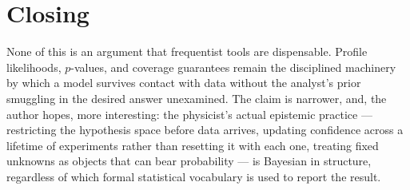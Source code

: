\documentclass[11pt]{book}
\theoremstyle{definition}
\theoremstyle{plain}
\theoremstyle{remark}
\begin{document}
\section{Closing}

None of this is an argument that frequentist tools are dispensable. Profile likelihoods, $p$-values, and coverage guarantees remain the disciplined machinery by which a model survives contact with data without the analyst's prior smuggling in the desired answer unexamined. The claim is narrower, and, the author hopes, more interesting: the physicist's actual epistemic practice --- restricting the hypothesis space before data arrives, updating confidence across a lifetime of experiments rather than resetting it with each one, treating fixed unknowns as objects that can bear probability --- is Bayesian in structure, regardless of which formal statistical vocabulary is used to report the result.
\end{document}
